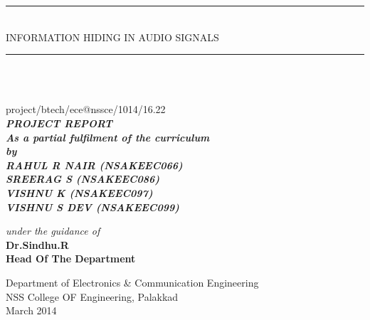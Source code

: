 \documentclass[a4paper, 12pt, notitlepage]{report}
\begin{document}
\begin{titlepage}
\newcommand{\horrule}[1]{\rule{\linewidth}{#1}} 	%
\begin{center}
		\horrule{0.5pt} \\
		\huge INFORMATION HIDING IN AUDIO SIGNALS \\
		\horrule{2pt} \\
		\end{center}
		{\centering
		\vspace{1cm}
		\\project/btech/ece@nssce/1014/16.22\\
		\vspace{1cm}
\large\bf{\emph{PROJECT REPORT}}\\

\it{As a partial fulfilment of the curriculum}\\
\vspace{0.25cm}
\vspace{0.1cm}
\vspace{1cm}
\it
by \\
\vspace{0.5cm}
\rm
{\large \bf {\emph{RAHUL R NAIR (NSAKEEC066)\\ SREERAG S (NSAKEEC086)\\VISHNU K (NSAKEEC097)\\VISHNU S DEV (NSAKEEC099)}}}\\

\vspace{1.0cm}

{\it{under the guidance of}} \\
\vspace{0.5cm}
\hspace{0.05cm} {\large \bf {Dr.Sindhu.R}}\\
\hspace{0.025cm} {\large \bf {Head Of The Department}}\\
\vspace {0.5cm}
\vspace {0.5cm}
\begin{figure}[h]
{\par}
\end{figure}
\begin{center}
Department of Electronics \& Communication Engineering \\
NSS College OF Engineering, Palakkad \\March 2014
\end{center}
}
\end{titlepage}
\end{document}

